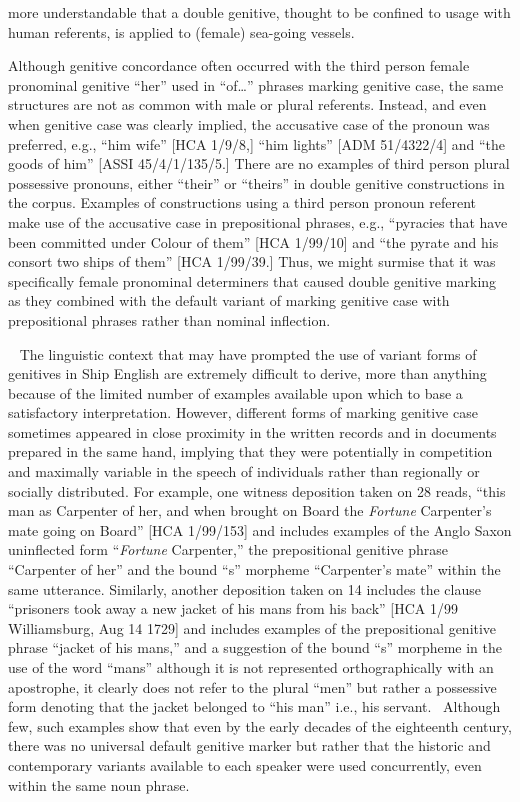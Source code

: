 more understandable that a double genitive, thought to be confined to usage with human referents, is applied to (female) sea-going vessels. 

  Although genitive concordance often occurred with the third person female pronominal genitive “her” used in “of…” phrases marking genitive case, the same structures are not as common with male or plural referents. Instead, and even when genitive case was clearly implied, the accusative case of the pronoun was preferred, e.g., “him wife” [HCA 1/9/8,] “him lights” [ADM 51/4322/4] and “the goods of him” [ASSI 45/4/1/135/5.] There are no examples of third person plural possessive pronouns, either “their” or “theirs” in double genitive constructions in the corpus. Examples of constructions using a third person pronoun referent make use of the accusative case in prepositional phrases, e.g., “pyracies that have been committed under Colour of them” [HCA 1/99/10] and “the pyrate and his consort two ships of them” [HCA 1/99/39.] Thus, we might surmise that it was specifically female pronominal determiners that caused double genitive marking as they combined with the default variant of marking genitive case with prepositional phrases rather than nominal inflection. 

~  The linguistic context that may have prompted the use of variant forms of genitives in Ship English are extremely difficult to derive, more than anything because of the limited number of examples available upon which to base a satisfactory interpretation. However, different forms of marking genitive case sometimes appeared in close proximity in the written records and in documents prepared in the same hand, implying that they were potentially in competition and maximally variable in the speech of individuals rather than regionally or socially distributed. For example, one witness deposition taken on 28 \citealt{March1722} reads, “this man as Carpenter of her, and when brought on Board the \textit{Fortune} Carpenter’s mate going on Board” [HCA 1/99/153] and includes examples of the Anglo Saxon uninflected form “\textit{Fortune} Carpenter,” the prepositional genitive phrase “Carpenter of her” and the bound “s” morpheme “Carpenter’s mate” within the same utterance. Similarly, another deposition taken on 14 \citealt{August1729} includes the clause “prisoners took away a new jacket of his mans from his back” [HCA 1/99 Williamsburg, Aug 14 1729] and includes examples of the prepositional genitive phrase “jacket of his mans,” and a suggestion of the bound “s” morpheme in the use of the word “mans” although it is not represented orthographically with an apostrophe, it clearly does not refer to the plural “men” but rather a possessive form denoting that the jacket belonged to “his man” i.e., his servant. ~Although few, such examples show that even by the early decades of the eighteenth century, there was no universal default genitive marker but rather that the historic and contemporary variants available to each speaker were used concurrently, even within the same noun phrase. 

